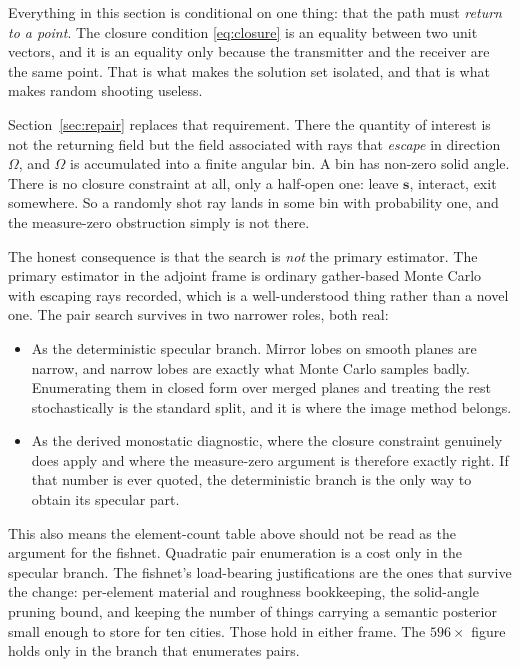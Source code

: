 \documentclass[11pt,a4paper]{article}
\newcommand{\bs}{\mathbf{s}}
\begin{document}
Everything in this section is conditional on one thing: that the path must
\emph{return to a point}. The closure condition \eqref{eq:closure} is an equality
between two unit vectors, and it is an equality only because the transmitter and
the receiver are the same point. That is what makes the solution set isolated, and
that is what makes random shooting useless.

Section~\ref{sec:repair} replaces that requirement. There the quantity of interest
is not the returning field but the field associated with rays that \emph{escape}
in direction $\Omega$, and $\Omega$ is accumulated into a finite angular bin. A
bin has non-zero solid angle. There is no closure constraint at all, only a
half-open one: leave $\bs$, interact, exit somewhere. So a randomly shot ray lands
in some bin with probability one, and the measure-zero obstruction simply is not
there.

The honest consequence is that the search is \emph{not} the primary estimator. The
primary estimator in the adjoint frame is ordinary gather-based Monte Carlo with
escaping rays recorded, which is a well-understood thing rather than a novel one.
The pair search survives in two narrower roles, both real:

\begin{itemize}
\item As the deterministic specular branch. Mirror lobes on smooth planes are
      narrow, and narrow lobes are exactly what Monte Carlo samples badly. Enumerating
      them in closed form over merged planes and treating the rest stochastically is
      the standard split, and it is where the image method belongs.
\item As the derived monostatic diagnostic, where the closure constraint genuinely
      does apply and where the measure-zero argument is therefore exactly right. If
      that number is ever quoted, the deterministic branch is the only way to obtain
      its specular part.
\end{itemize}

This also means the element-count table above should not be read as the argument
for the fishnet. Quadratic pair enumeration is a cost only in the specular branch.
The fishnet's load-bearing justifications are the ones that survive the change:
per-element material and roughness bookkeeping, the solid-angle pruning bound, and
keeping the number of things carrying a semantic posterior small enough to store
for ten cities. Those hold in either frame. The $596\times$ figure holds only in
the branch that enumerates pairs.
\end{document}
